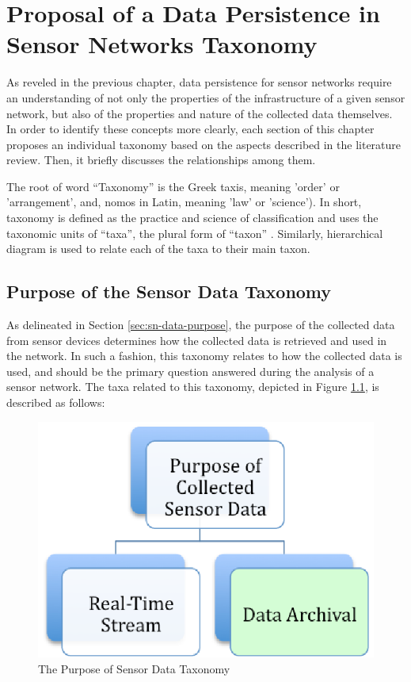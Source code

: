 

\chapter{Proposal of a Data Persistence in Sensor Networks Taxonomy}
\label{chap:taxonomies}

As reveled in the previous chapter, data persistence for sensor
networks require an understanding of not only the properties of the
infrastructure of a given sensor network, but also of the properties and nature
of the collected data themselves. In order to
identify these concepts more clearly, each section of this chapter proposes an
individual taxonomy based on the aspects described in the literature
review. Then, it briefly discusses the relationships among them.

The root of word ``Taxonomy'' is the Greek taxis, meaning 'order' or
'arrangement', and, nomos in Latin, meaning 'law' or 'science'). In
short, taxonomy is defined as the practice and science of classification and
uses the taxonomic units of ``taxa'', the plural form of ``taxon''
\cite{taxonomy}. Similarly, hierarchical diagram is used to relate each of the
taxa to their main taxon. 

\section{Purpose of the Sensor Data Taxonomy}

As delineated in Section \ref{sec:sn-data-purpose}, the purpose of the
collected data from sensor devices determines how the collected data is
retrieved and used in the network. In such a fashion, this taxonomy relates to
how the collected data is used, and should be the primary question answered 
during the analysis of a sensor network. The taxa related to this
taxonomy, depicted in Figure \ref{fig:taxonomy-data-purpose}, is described as
follows:

\begin{figure}[h]
  \centering
  \includegraphics{../diagrams/taxonomy-data-purpose}
  \caption{The Purpose of Sensor Data Taxonomy}
  \label{fig:taxonomy-data-purpose}
\end{figure}

